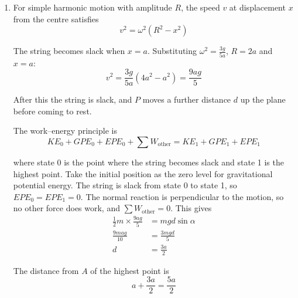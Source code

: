 \documentclass[leqno]{article}
\begin{document}
\begin{enumerate}[
  label=\textbf{\arabic*.},
  leftmargin=*,
  topsep=0pt,
  partopsep=0pt,
  parsep=0pt
]
\begin{djsSolution}
\begin{enumerate}[label=\textbf{(\alph*)}, start=1]
The first time this happens is when \(\omega t=\frac{\pi}{6}\), so
\[
t=\frac{\pi}{6}\sqrt{\frac{5a}{3g}}
\]

\item For simple harmonic motion with amplitude \(R\), the speed \(v\) at displacement \(x\) from the centre satisfies
\[
v^2=\omega^2\left(R^2-x^2\right)
\]

The string becomes slack when \(x=a\). Substituting \(\omega^2=\frac{3g}{5a}\), \(R=2a\) and \(x=a\):
\[
v^2=\frac{3g}{5a}\left(4a^2-a^2\right)=\frac{9ag}{5}
\]

After this the string is slack, and \(P\) moves a further distance \(d\) up the plane before coming to rest.

The work--energy principle is
\[
KE_0 + GPE_0 + EPE_0 + \sum W_{\text{other}} = KE_1 + GPE_1 + EPE_1
\]

where state 0 is the point where the string becomes slack and state 1 is the highest point. Take the initial position as the zero level for gravitational potential energy. The string is slack from state 0 to state 1, so \(EPE_0=EPE_1=0\). The normal reaction is perpendicular to the motion, so no other force does work, and \(\sum W_{\text{other}}=0\). This gives
\begin{align*}
\frac{1}{2}m\times\frac{9ag}{5}&=mgd\sin\alpha\\
\frac{9mag}{10}&=\frac{3mgd}{5}\\
d&=\frac{3a}{2}
\end{align*}

The distance from \(A\) of the highest point is
\[
a+\frac{3a}{2}=\frac{5a}{2}
\]
\end{enumerate}
\end{djsSolution}

\newpage

\questionitem

\begin{figure}[H]
    \centering
{}
\end{figure}
\end{enumerate}
\end{document}
